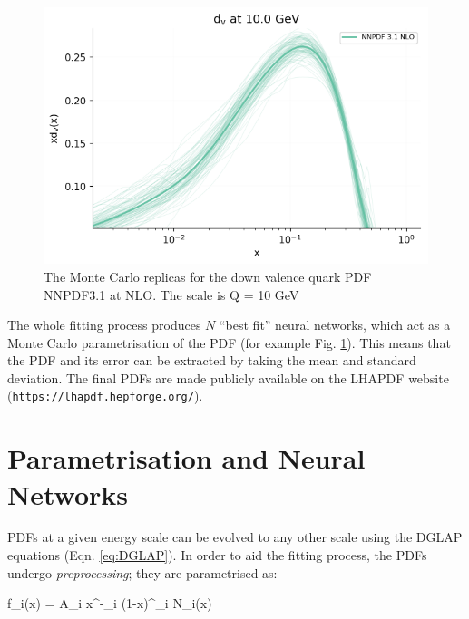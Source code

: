 \begin{figure}
  \begin{minipage}[c]{0.40\textwidth}
    \caption{
       The Monte Carlo replicas for the down valence quark PDF NNPDF3.1 at NLO. The scale is Q = 10 GeV
    } \label{replicas}
  \end{minipage}
  \begin{minipage}[c]{0.55\textwidth}
    \includegraphics[width=\textwidth]{background/Qs0_NNPDF31NLO_plot_pdfreplicas_d_v.png}
  \end{minipage}\hfill
\end{figure}
The whole fitting process produces $N$ ``best fit'' neural networks, which act as a Monte Carlo parametrisation of the PDF (for example Fig. \ref{replicas}). This means that the PDF and its error can be extracted by taking the mean and standard deviation. The final PDFs are made publicly available on the LHAPDF \cite{Buckley:2014ana} website (\texttt{https://lhapdf.hepforge.org/}).

\section{Parametrisation and Neural Networks}

PDFs at a given energy scale can be evolved to any other scale using the DGLAP equations 
(Eqn. \ref{eq:DGLAP}).
In order to aid the fitting process, the PDFs undergo \textit{preprocessing};
they are parametrised as:

\beq
  f_i(x) = A_i x^{-\alpha_i} (1-x)^{\beta_i} N_i(x)
\eeq

